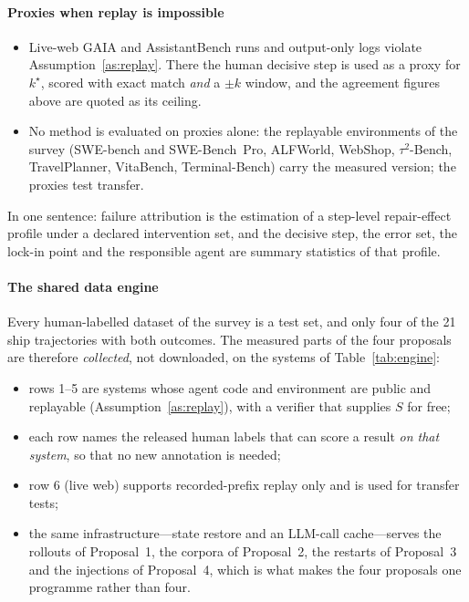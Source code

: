 \paragraph{Proxies when replay is impossible}
\begin{itemize}[leftmargin=1.1em]
\item Live-web GAIA and AssistantBench runs and output-only logs violate Assumption~\ref{as:replay}. There the human decisive step is used as a proxy for $k^\star$, scored with exact match \emph{and} a $\pm k$ window, and the agreement figures above are quoted as its ceiling.
\item No method is evaluated on proxies alone: the replayable environments of the survey (SWE-bench and SWE-Bench~Pro, ALFWorld, WebShop, $\tau^2$-Bench, TravelPlanner, VitaBench, Terminal-Bench) carry the measured version; the proxies test transfer.
\end{itemize}
In one sentence: failure attribution is the estimation of a step-level repair-effect profile under a declared intervention set, and the decisive step, the error set, the lock-in point and the responsible agent are summary statistics of that profile.

\paragraph{The shared data engine} Every human-labelled dataset of the survey is a test set, and only four of the 21 ship trajectories with both outcomes. The measured parts of the four proposals are therefore \emph{collected}, not downloaded, on the systems of Table~\ref{tab:engine}:
\begin{itemize}[leftmargin=1.1em]
\item rows 1--5 are systems whose agent code and environment are public and replayable (Assumption~\ref{as:replay}), with a verifier that supplies $S$ for free;
\item each row names the released human labels that can score a result \emph{on that system}, so that no new annotation is needed;
\item row 6 (live web) supports recorded-prefix replay only and is used for transfer tests;
\item the same infrastructure---state restore and an LLM-call cache---serves the rollouts of Proposal~1, the corpora of Proposal~2, the restarts of Proposal~3 and the injections of Proposal~4, which is what makes the four proposals one programme rather than four.
\end{itemize}

